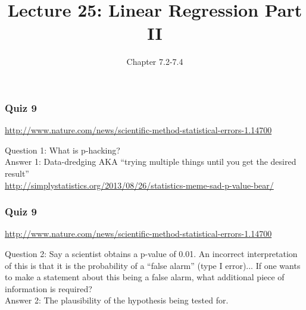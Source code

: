\documentclass[handout]{beamer}
\title{Lecture 25: Linear Regression Part II}
\author{Chapter 7.2-7.4}
\date{}
\newcommand{\blue}[1]{\textcolor{blue2}{#1}}
\begin{document}
\begin{frame}
\titlepage
\end{frame}


\begin{frame}[fragile]
\frametitle{Quiz 9}

\blue{\url{http://www.nature.com/news/scientific-method-statistical-errors-1.14700}}

\vspace{0.5cm}

\blue{Question 1}: What is p-hacking?\\
\pause \blue{Answer 1}: Data-dredging AKA ``trying multiple things until you get the desired result''\\ 
\pause\blue{\url{http://simplystatistics.org/2013/08/26/statistics-meme-sad-p-value-bear/}}

\end{frame}


\begin{frame}[fragile]
\frametitle{Quiz 9}

\blue{\url{http://www.nature.com/news/scientific-method-statistical-errors-1.14700}}

\vspace{0.5cm}

\blue{Question 2}: Say a scientist obtains a p-value of 0.01.  An incorrect interpretation of this is that it is the probability of a ``false alarm'' (type I error)...  If one wants to make a statement about this being a false alarm, what additional piece of information is required?\\
\pause \blue{Answer 2}: The plausibility of the hypothesis being tested for.  

\end{frame}
\end{document}
